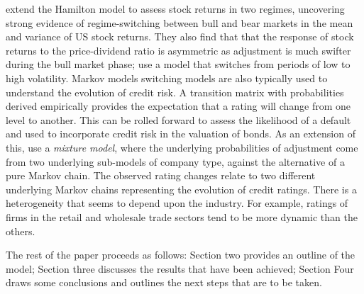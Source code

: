 \documentclass[12pt, a4paper, oneside]{article} %
\begin{document}
\citet{schaller1997regime} extend the Hamilton model to assess stock returns in two regimes, uncovering strong evidence of regime-switching between bull and bear markets in the mean and variance of US stock returns.  They also find that that the response of stock returns to the price-dividend ratio is asymmetric as adjustment is much swifter during the bull market phase; \citet{dueker1997markov} use a model that switches from periods of low to high volatility. Markov models switching models are also typically used to understand the evolution of credit risk.  A transition matrix with probabilities derived empirically provides the expectation that a rating will change from one level to another.  This can be rolled forward to assess the likelihood of a default and used to incorporate credit risk in the valuation of bonds.  As an extension of this,  \citet{frydman2008credit} use a \emph{mixture model}, where the underlying probabilities of adjustment come from two underlying sub-models of company type, against the alternative of a pure Markov chain. The observed rating changes relate to two different underlying Markov chains representing the evolution of credit ratings.  There is a heterogeneity that seems to depend upon the industry.  For example, ratings of firms in the retail and wholesale trade sectors tend to be more dynamic than the others. 

The rest of the paper proceeds as follows:  Section two provides an outline of the model; Section three discusses the results that have been achieved; Section Four draws some conclusions and outlines the next steps that are to be taken. 


\end{document}
